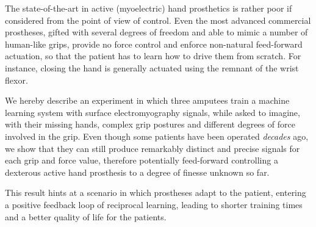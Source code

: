 The state-of-the-art in active (myoelectric) hand prosthetics is
rather poor if considered from the point of view of control.
Even the most advanced commercial prostheses, gifted with
several degrees of freedom and able to mimic a number of human-like
grips, provide no force control and enforce non-natural feed-forward
actuation, so that the patient has to learn how to drive them from
scratch. For instance, closing the hand is generally actuated using
the remnant of the wrist flexor.

We hereby describe an experiment in which three amputees train a machine
learning system with surface electromyography signals, while asked to
imagine, with their missing hands, complex grip postures and different
degrees of force involved in the grip. Even though some patients have been
operated \emph{decades} ago, we show that they can still produce remarkably
distinct and precise signals for each grip and force value, therefore
potentially feed-forward controlling a dexterous active hand prosthesis
to a degree of finesse unknown so far.

This result hints at a scenario in
which prostheses adapt to the patient, entering a positive feedback loop
of reciprocal learning, leading to shorter training times and a better
quality of life for the patients.
